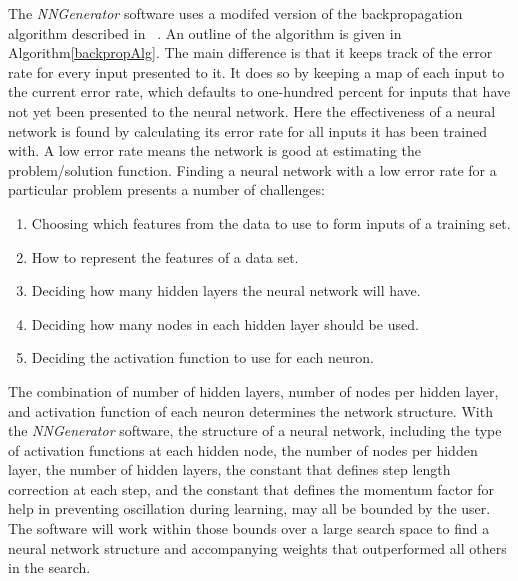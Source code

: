 The {\it NNGenerator} software uses a modifed version of the
backpropagation algorithm described in ~\cite[166-170]{rojas}.
An outline of the algorithm is given in Algorithm\ref{backpropAlg}.
The main difference is that it keeps track of the error rate for every
input presented to it.
It does so by keeping a map of each input to the current error rate,
which defaults to one-hundred percent for inputs that have not yet
been presented to the neural network.
Here the effectiveness of a neural network is found by calculating
its error rate for all inputs it has been trained with. 
A low error rate means the network is good at estimating the
problem/solution function. 
Finding a neural network with a low error rate for a particular
problem presents a number of challenges:
\begin{enumerate}

\item Choosing which features from the data to
use to form inputs of a training set.

\item How to represent the features of a data set.

\item Deciding how many hidden layers the neural network will have.

\item Deciding how many nodes in each hidden layer should be used.

\item Deciding the activation function to use for each neuron.

\end{enumerate}
The combination of number of hidden layers, number of nodes per hidden
layer, and activation function of each neuron determines the network structure. 
With the {\it NNGenerator} software, the structure of a neural
network, including the type of activation functions at each hidden
node, the number of nodes per hidden layer, the number of hidden
layers, the constant that defines step length correction at each step,
and the constant that defines the momentum factor for help in
preventing oscillation during learning, may all be bounded by the
user.
The software will work within those bounds over a large search space
to find a neural network structure and accompanying weights that
outperformed all others in the search.
